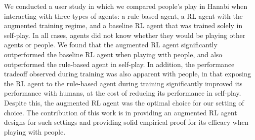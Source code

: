 \documentclass[letterpaper]{article} %
\begin{document}
 We conducted a user study in which we compared people's play in Hanabi when interacting with three types of agents:  a rule-based agent, a RL agent with the augmented training regime, and a baseline RL agent that was
trained solely in self-play. In all cases, agents did not know whether they would be playing other agents or people.
We found that the augmented RL agent  significantly  outperformed  the baseline RL agent when playing with people, and also outperformed the  rule-based agent in self-play.
In addition, the performance tradeoff observed during training was also apparent with people, in that   exposing the RL agent to the rule-based agent during training significantly  improved its performance with humans, at the cost of reducing its performance in self-play. Despite this,  the augmented RL agent was the optimal choice  for our setting of choice.
The  contribution of this work is in providing an augmented RL agent designs for such settings and providing solid empirical proof for its efficacy when playing with people.


\end{document}
